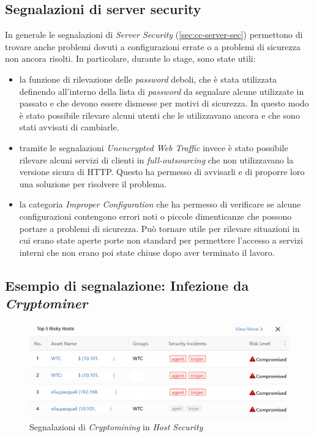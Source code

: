 \subsection{Segnalazioni di server security}

In generale le segnalazioni di \emph{Server Security} (\autoref{sec:cc-server-sec}) permettono di trovare anche problemi dovuti a configurazioni errate o a problemi di sicurezza non ancora risolti. In particolare, durante lo stage, sono state utili:

\begin{itemize}
    \item la funzione di rilevazione delle \emph{password} deboli, che è stata utilizzata definendo all'interno della lista di \emph{password} da segnalare alcune utilizzate in passato e che devono essere dismesse per motivi di sicurezza. In questo modo è stato possibile rilevare alcuni utenti che le utilizzavano ancora e che sono stati avvisati di cambiarle.
    \item tramite le segnalazioni \emph{Unencrypted Web Traffic} invece è stato possibile rilevare alcuni servizi di clienti in \emph{full-outsourcing} che non utilizzavano la versione sicura di HTTP. Questo ha permesso di avvisarli e di proporre loro una soluzione per risolvere il problema.
    \item la categoria \emph{Improper Configuration} che ha permesso di verificare se alcune configurazioni contengono errori noti o piccole dimenticanze che possono portare a problemi di sicurezza. Può tornare utile per rilevare situazioni in cui erano state aperte porte non standard per permettere l'accesso a servizi interni che non erano poi state chiuse dopo aver terminato il lavoro.
\end{itemize}

\subsection{Esempio di segnalazione: Infezione da \emph{Cryptominer} }
\label{sez:crypto-alert}

\begin{figure}[!htbp]
    \centering
    \includegraphics[width=0.8\linewidth]{images/ndr/crypto-host-sec.png}
    \caption{Segnalazioni di \emph{Cryptomining} in \emph{Host Security}}
    \label{fig:crypto-alerts}
\end{figure}


